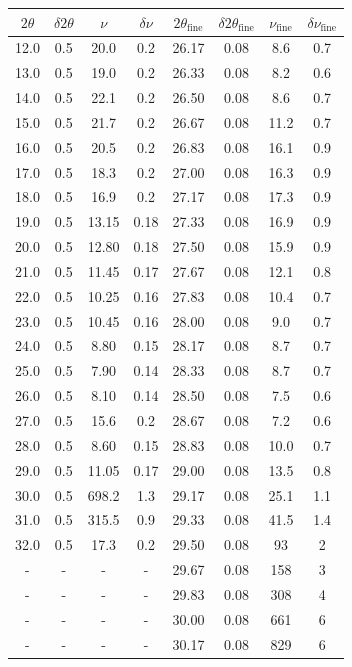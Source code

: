 \begin{table}
\centering \small
\begin{tabular}{cccc|cccc}
$2\theta$ & $\delta 2\theta$ & $\nu$ & $\delta \nu$ & $2\theta_\text{fine}$ & $\delta 2\theta_\text{fine}$ & $\nu_\text{fine}$ & $\delta \nu_\text{fine}$ \\
\hline
12.0 & 0.5 & 20.0 & 0.2 & 26.17 & 0.08 & 8.6 & 0.7\\
13.0 & 0.5 & 19.0 & 0.2 & 26.33 & 0.08 & 8.2 & 0.6\\
14.0 & 0.5 & 22.1 & 0.2 & 26.50 & 0.08 & 8.6 & 0.7\\
15.0 & 0.5 & 21.7 & 0.2 & 26.67 & 0.08 & 11.2 & 0.7\\
16.0 & 0.5 & 20.5 & 0.2 & 26.83 & 0.08 & 16.1 & 0.9\\
17.0 & 0.5 & 18.3 & 0.2 & 27.00 & 0.08 & 16.3 & 0.9\\
18.0 & 0.5 & 16.9 & 0.2 & 27.17 & 0.08 & 17.3 & 0.9\\
19.0 & 0.5 & 13.15 & 0.18 & 27.33 & 0.08 & 16.9 & 0.9\\
20.0 & 0.5 & 12.80 & 0.18 & 27.50 & 0.08 & 15.9 & 0.9\\
21.0 & 0.5 & 11.45 & 0.17 & 27.67 & 0.08 & 12.1 & 0.8\\
22.0 & 0.5 & 10.25 & 0.16 & 27.83 & 0.08 & 10.4 & 0.7\\
23.0 & 0.5 & 10.45 & 0.16 & 28.00 & 0.08 & 9.0 & 0.7\\
24.0 & 0.5 & 8.80 & 0.15 & 28.17 & 0.08 & 8.7 & 0.7\\
25.0 & 0.5 & 7.90 & 0.14 & 28.33 & 0.08 & 8.7 & 0.7\\
26.0 & 0.5 & 8.10 & 0.14 & 28.50 & 0.08 & 7.5 & 0.6\\
27.0 & 0.5 & 15.6 & 0.2 & 28.67 & 0.08 & 7.2 & 0.6\\
28.0 & 0.5 & 8.60 & 0.15 & 28.83 & 0.08 & 10.0 & 0.7\\
29.0 & 0.5 & 11.05 & 0.17 & 29.00 & 0.08 & 13.5 & 0.8\\
30.0 & 0.5 & 698.2 & 1.3 & 29.17 & 0.08 & 25.1 & 1.1\\
31.0 & 0.5 & 315.5 & 0.9 & 29.33 & 0.08 & 41.5 & 1.4\\
32.0 & 0.5 & 17.3 & 0.2 & 29.50 & 0.08 & 93 & 2\\
- & - & - & - & 29.67 & 0.08 & 158 & 3\\
  -   &  -   &   -   &  -   & 29.83 & 0.08 & 308 & 4\\
  -   &  -   &   -   &  -   & 30.00 & 0.08 & 661 & 6\\
  -   &  -   &   -   &  -   & 30.17 & 0.08 & 829 & 6\\

\end{tabular}
\end{table}
